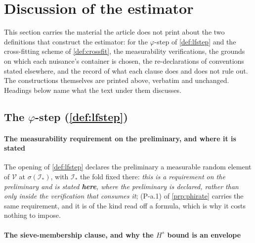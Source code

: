 \section*{Discussion of the estimator}

\noindent This section carries the material the article does not print about the two definitions that
construct the estimator: for the $\varphi$-step of \cref{def:lfstep} and the cross-fitting scheme of
\cref{def:crossfit}, the measurability verifications, the grounds on which each nuisance's container is
chosen, the re-declarations of conventions stated elsewhere, and the record of what each clause does and
does not rule out. The constructions themselves are printed above, verbatim and unchanged. Headings below
name what the text under them discusses.


\subsection*{The $\varphi$-step (\cref{def:lfstep})}

\paragraph{The measurability requirement on the preliminary, and where it is stated}

The opening of \cref{def:lfstep} declares the preliminary a measurable random element of $\mathcal V$
at $\sigma(\mathcal I_\ast)$, with $\mathcal I_\ast$ the fold fixed there: \emph{this is a requirement on the preliminary and
is stated \textbf{here}, where the preliminary is declared, rather than only inside the verification that
consumes it}; (P-a.1) of \cref{prp:phirate} carries the same requirement, and it is of the kind read off
a formula, which is why it costs nothing to impose.

\paragraph{The sieve-membership clause, and why the $H^{s}$ bound is an envelope}

